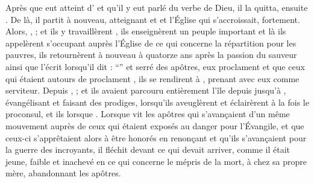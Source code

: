 Après que  eut  atteint  d' et qu'il y eut parlé du verbe de Dieu, il la quitta,  ensuite  . 
De là, il partit à nouveau, atteignant  et  et l'Église qui s'accroissait,  fortement.
Alors,  ,  ; et ils y travaillèrent , ils enseignèrent un peuple important %
et là ils appelèrent  %
s'occupant auprès l'Église de ce qui concerne la répartition pour les pauvres, 
ils retournèrent à nouveau à  quatorze ans après la passion du sauveur %
ainsi que l'écrit  lorsqu'il dit : 
\enquote{} %
 et serré  des apôtres, eux proclament  et que ceux qui étaient autours de  proclament , 
ils se rendirent à , prenant avec eux  comme serviteur. %
Depuis ,  ;
et ils avaient parcouru entièrement l'île depuis  jusqu'à , évangélisant et faisant des prodiges, lorsqu'ils aveuglèrent    et éclairèrent à la fois le proconsul, et ils  %
lorsque     . %
Lorsque  vit les apôtres qui s'avançaient d'un même mouvement %
auprès de ceux qui étaient exposés au danger pour l'Évangile,
et que ceux-ci s'apprêtaient alors à être honorés en 
renonçant   et qu'ils s'avançaient pour la guerre des incroyants, 
il fléchit devant ce qui devait arriver, 
comme il était jeune, faible et inachevé en ce qui concerne le mépris de la mort, 
  à  chez sa propre mère, abandonnant les apôtres.

